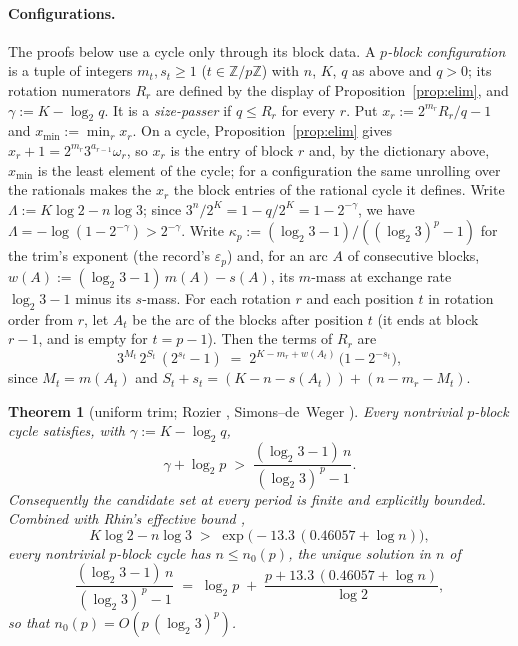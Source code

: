 \documentclass[11pt]{article}
\newtheorem{theorem}{Theorem}[section]
\theoremstyle{remark}
\newcommand{\Z}{\mathbb{Z}}
\newcommand{\w}{\omega}
\newcommand{\LL}{\log_2 3}
\newcommand{\kp}{\kappa_p}
\begin{document}
\paragraph{Configurations.} The proofs below use a cycle only through its block data. A \emph{$p$-block configuration} is a tuple of integers $m_t, s_t \ge 1$ ($t \in \Z/p\Z$) with $n$, $K$, $q$ as above and $q > 0$; its rotation numerators $R_r$ are defined by the display of Proposition~\ref{prop:elim}, and $\gamma := K - \log_2 q$. It is a \emph{size-passer} if $q \le R_r$ for every $r$. Put $x_r := 2^{m_r}R_r/q - 1$ and $x_{\min} := \min_r x_r$. On a cycle, Proposition~\ref{prop:elim} gives $x_r + 1 = 2^{m_r}3^{a_{r-1}}\w_r$, so $x_r$ is the entry of block $r$ and, by the dictionary above, $x_{\min}$ is the least element of the cycle; for a configuration the same unrolling over the rationals makes the $x_r$ the block entries of the rational cycle it defines. Write $\Lambda := K\log 2 - n\log 3$; since $3^n/2^K = 1 - q/2^K = 1 - 2^{-\gamma}$, we have $\Lambda = -\log(1 - 2^{-\gamma}) > 2^{-\gamma}$. Write $\kp := (\LL - 1)/((\LL)^p - 1)$ for the trim's exponent (the record's $\varepsilon_p$) and, for an arc $A$ of consecutive blocks, $w(A) := (\LL - 1)\,m(A) - s(A)$, its $m$-mass at exchange rate $\LL - 1$ minus its $s$-mass. For each rotation $r$ and each position $t$ in rotation order from $r$, let $A_t$ be the arc of the blocks after position $t$ (it ends at block $r-1$, and is empty for $t = p-1$). Then the terms of $R_r$ are
\begin{equation}\label{eq:term}
3^{M_t}\,2^{S_t}\,(2^{s_t}-1) \;=\; 2^{K - m_r + w(A_t)}\,\bigl(1 - 2^{-s_t}\bigr),
\end{equation}
since $M_t = m(A_t)$ and $S_t + s_t = (K - n - s(A_t)) + (n - m_r - M_t)$.

\begin{theorem}[uniform trim; Rozier \cite{rozier91}, Simons--de~Weger \cite{sdw}]\label{thm:uniform}
Every nontrivial $p$-block cycle satisfies, with $\gamma := K - \log_2 q$,
\[ \gamma + \log_2 p \;>\; \frac{(\LL - 1)\, n}{(\LL)^{\,p} - 1}. \]
Consequently the candidate set at every period is finite and explicitly bounded. Combined with Rhin's effective bound \cite{rhin},
\[ K\log 2 - n\log 3 \;>\; \exp\bigl(-13.3\,(0.46057 + \log n)\bigr), \]
every nontrivial $p$-block cycle has $n \le n_0(p)$, the unique solution in $n$ of
\[ \frac{(\LL - 1)\,n}{(\LL)^{\,p} - 1} \;=\; \log_2 p \;+\; \frac{p + 13.3\,(0.46057 + \log n)}{\log 2}, \]
so that $n_0(p) = O(p\,(\LL)^p)$.
\end{theorem}
\end{document}
